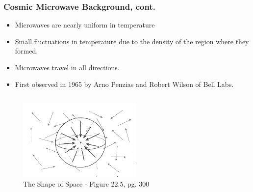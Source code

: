 \documentclass[13pt]{beamer}
\begin{document}
\begin{frame}
\frametitle{Cosmic Microwave Background, cont.}
  \begin{itemize}
    \item Microwaves are nearly uniform in temperature
    \item Small fluctuations in temperature due to the density of the region where they formed.
    \item Microwaves travel in all directions.
    \item First observed in 1965 by Arno Penzias and Robert Wilson of Bell Labs.
  \end{itemize}

    \begin{columns}[c] %
     \centering
      \begin{figure}
        \includegraphics[height=4cm]{./img/scattering} %
        \caption{The Shape of Space - Figure 22.5, pg. 300}
      \end{figure}
  \end{columns}

\end{frame}
\end{document}
